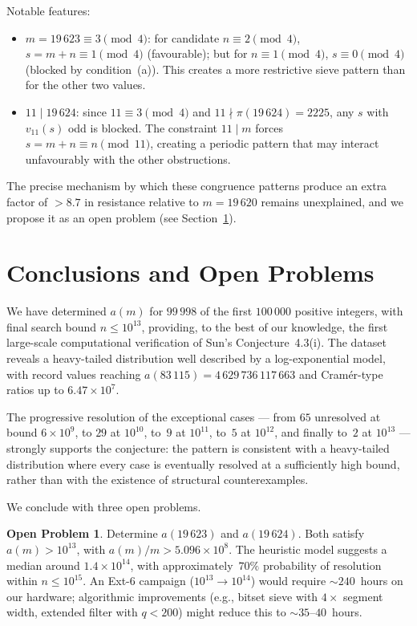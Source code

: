 \documentclass{amsart}
\theoremstyle{definition}
\newtheorem{openproblem}[theorem]{Open Problem}
\theoremstyle{remark}
\numberwithin{equation}{section}
\newcommand{\vq}[1]{v_{#1}}
\begin{document}
Notable features:
\begin{itemize}
\item $m = 19\,623 \equiv 3 \pmod{4}$: for candidate
  $n \equiv 2 \pmod{4}$, $s = m + n \equiv 1 \pmod{4}$
  (favourable); but for $n \equiv 1 \pmod{4}$,
  $s \equiv 0 \pmod{4}$ (blocked by condition~(a)).
  This creates a more restrictive sieve pattern than for the other
  two values.
\item $11 \mid 19\,624$: since $11 \equiv 3 \pmod{4}$ and
  $11 \nmid \pi(19\,624) = 2225$, any $s$ with $\vq{11}(s)$ odd
  is blocked.  The constraint $11 \mid m$ forces
  $s = m + n \equiv n \pmod{11}$, creating a periodic pattern
  that may interact unfavourably with the other obstructions.
\end{itemize}

The precise mechanism by which these congruence patterns produce an
extra factor of $>8.7$ in resistance relative to $m = 19\,620$
remains unexplained, and we propose it as an open problem
(see Section~\ref{sec:conclusions}).

\section{Conclusions and Open Problems}
\label{sec:conclusions}

We have determined $a(m)$ for $99\,998$ of the first $100\,000$
positive integers, with final search bound $n \le 10^{13}$,
providing, to the best of our knowledge, the first large-scale
computational verification of Sun's Conjecture~4.3(i).  The dataset reveals a heavy-tailed distribution
well described by a log-exponential model, with record values
reaching $a(83\,115) = 4\,629\,736\,117\,663$ and
Cram\'er-type ratios up to $6.47 \times 10^7$.

The progressive resolution of the exceptional cases --- from $65$
unresolved at bound $6 \times 10^9$, to $29$ at $10^{10}$, to~$9$
at $10^{11}$, to~$5$ at $10^{12}$, and finally to~$2$ at
$10^{13}$ --- strongly supports the conjecture: the pattern is
consistent with a heavy-tailed distribution where
every case is eventually resolved at a sufficiently high bound,
rather than with the existence of structural counterexamples.

We conclude with three open problems.

\begin{openproblem}\label{op:unresolved}
Determine $a(19\,623)$ and $a(19\,624)$.  Both satisfy
$a(m) > 10^{13}$, with $a(m)/m > 5.096 \times 10^8$.
The heuristic model suggests a median around
$1.4 \times 10^{14}$, with approximately~$70\%$ probability
of resolution within $n \le 10^{15}$.
An Ext-6 campaign ($10^{13} \to 10^{14}$) would require
$\sim 240$~hours on our hardware; algorithmic improvements
(e.g., bitset sieve with $4\times$ segment width,
extended filter with $q < 200$) might reduce this to
$\sim 35$--$40$~hours.
\end{openproblem}
\end{document}

